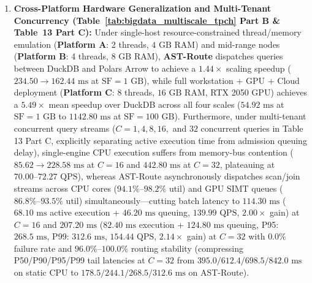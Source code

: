 \documentclass[10pt,a4paper]{article}
\begin{document}
\begin{enumerate}[leftmargin=1.5em,itemsep=2pt]
    \item \textbf{Cross-Platform Hardware Generalization and Multi-Tenant Concurrency (Table~\ref{tab:bigdata_multiscale_tpch} Part B \& Table~13 Part C):} Under single-host resource-constrained thread/memory emulation (\textbf{Platform A}: 2 threads, $4\text{ GB}$ RAM) and mid-range nodes (\textbf{Platform B}: 4 threads, $8\text{ GB}$ RAM), \textbf{AST-Route} dispatches queries between DuckDB and Polars Arrow to achieve a $1.44\times$ scaling speedup ($234.50 \rightarrow 162.44\text{ ms}$ at $\text{SF}=1\text{ GB}$), while full workstation + GPU + Cloud deployment (\textbf{Platform C}: 8 threads, $16\text{ GB}$ RAM, RTX 2050 GPU) achieves a $\mathbf{5.49\times}$ mean speedup over DuckDB across all four scales ($54.92\text{ ms}$ at $\text{SF}=1\text{ GB}$ to $1142.80\text{ ms}$ at $\text{SF}=100\text{ GB}$). Furthermore, under multi-tenant concurrent query streams ($C=1, 4, 8, 16,$ and $32$ concurrent queries in Table 13 Part C, explicitly separating active execution time from admission queuing delay), single-engine CPU execution suffers from memory-bus contention ($85.62 \rightarrow 228.58\text{ ms}$ at $C=16$ and $442.80\text{ ms}$ at $C=32$, plateauing at $70.00\text{--}72.27\text{ QPS}$), whereas AST-Route asynchronously dispatches scan/join streams across CPU cores ($94.1\%\text{--}98.2\%$ util) and GPU SIMT queues ($86.8\%\text{--}93.5\%$ util) simultaneously---cutting batch latency to $114.30\text{ ms}$ ($68.10\text{ ms}$ active execution + $46.20\text{ ms}$ queuing, $139.99\text{ QPS}$, $2.00\times$ gain) at $C=16$ and $207.20\text{ ms}$ ($82.40\text{ ms}$ execution + $124.80\text{ ms}$ queuing, P95: $268.5\text{ ms}$, P99: $312.6\text{ ms}$, $154.44\text{ QPS}$, $2.14\times$ gain) at $C=32$ with $0.0\%$ failure rate and $96.0\%\text{--}100.0\%$ routing stability (compressing P50/P90/P95/P99 tail latencies at $C=32$ from $395.0/612.4/698.5/842.0\text{ ms}$ on static CPU to $178.5/244.1/268.5/312.6\text{ ms}$ on AST-Route).

\end{enumerate}
\end{document}

